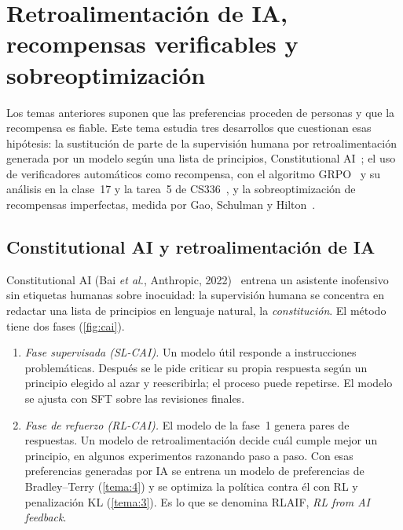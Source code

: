 \chapter{Retroalimentación de IA, recompensas verificables y sobreoptimización}
\label{tema:6}

Los temas anteriores suponen que las preferencias proceden de personas y que la recompensa es fiable. Este tema estudia tres desarrollos que cuestionan esas hipótesis: la sustitución de parte de la supervisión humana por retroalimentación generada por un modelo según una lista de principios, Constitutional AI~\cite{cai}; el uso de verificadores automáticos como recompensa, con el algoritmo GRPO~\cite{deepseekmath,r1} y su análisis en la clase~17 y la tarea~5 de CS336~\cite{cs336,cs336a5}, y la sobreoptimización de recompensas imperfectas, medida por Gao, Schulman y Hilton~\cite{gao}.

\section{Constitutional AI y retroalimentación de IA}

Constitutional AI (Bai \emph{et al.}, Anthropic, 2022)~\cite{cai} entrena un asistente inofensivo sin etiquetas humanas sobre inocuidad: la supervisión humana se concentra en redactar una lista de principios en lenguaje natural, la \emph{constitución}. El método tiene dos fases (\cref{fig:cai}).
\begin{enumerate}[label=\arabic*.]
  \item \emph{Fase supervisada (SL-CAI).} Un modelo útil responde a instrucciones problemáticas. Después se le pide criticar su propia respuesta según un principio elegido al azar y reescribirla; el proceso puede repetirse. El modelo se ajusta con SFT sobre las revisiones finales.
  \item \emph{Fase de refuerzo (RL-CAI).} El modelo de la fase~1 genera pares de respuestas. Un modelo de retroalimentación decide cuál cumple mejor un principio, en algunos experimentos razonando paso a paso. Con esas preferencias generadas por IA se entrena un modelo de preferencias de Bradley--Terry (\cref{tema:4}) y se optimiza la política contra él con RL y penalización KL (\cref{tema:3}). Es lo que se denomina RLAIF, \emph{RL from AI feedback}.
\end{enumerate}

